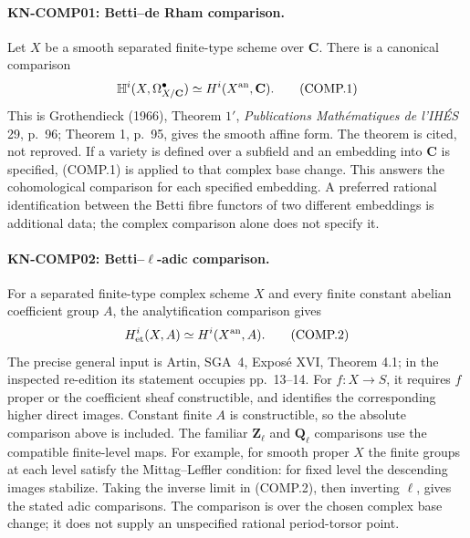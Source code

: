 \documentclass[11pt,a4paper]{article}
\theoremstyle{definition}\newtheorem{definition}[theorem]{Definition}
\theoremstyle{remark}\newtheorem{remark}[theorem]{Remark}
\begin{document}
\paragraph{KN-COMP01: Betti--de Rham comparison.}
Let $X$ be a smooth separated finite-type scheme over $\mathbf C$.
There is a canonical comparison
\[
 \mathbb H^i(X,\Omega^\bullet_{X/\mathbf C})
       \simeq H^i(X^{\rm an},\mathbf C).
 \tag{COMP.1}
\]
This is Grothendieck (1966), Theorem $1'$,
\emph{Publications Math\'ematiques de l'IH\'ES} 29, p.~96;
Theorem 1, p.~95, gives the smooth affine form.  The theorem is
cited, not reproved.  If a variety is defined over a subfield and
an embedding into $\mathbf C$ is specified, (COMP.1) is applied to
that complex base change.  This answers the cohomological comparison
for each specified embedding.  A preferred rational identification
between the Betti fibre functors of two different embeddings is
additional data; the complex comparison alone does not specify it.

\paragraph{KN-COMP02: Betti--\texorpdfstring{$\ell$}{ell}-adic comparison.}
For a separated finite-type complex scheme $X$ and every finite
constant abelian coefficient group $A$, the analytification comparison gives
\[
 H^i_{\rm et}(X,A)\simeq H^i(X^{\rm an},A).
 \tag{COMP.2}
\]
The precise general input is Artin, SGA~4, Expos\'e XVI,
Theorem 4.1; in the inspected re-edition its statement occupies
pp.~13--14.  For $f:X\to S$, it requires $f$ proper or the
coefficient sheaf constructible, and identifies the corresponding
higher direct images.  Constant finite $A$ is constructible, so the
absolute comparison above is included.  The familiar $\mathbf Z_\ell$
and $\mathbf Q_\ell$ comparisons use the compatible finite-level maps.
For example, for smooth proper $X$ the finite groups at each level
satisfy the Mittag--Leffler condition: for fixed level the descending
images stabilize.  Taking the inverse limit in (COMP.2), then
inverting $\ell$, gives the stated adic comparisons.  The comparison
is over the chosen complex base change; it does not supply an
unspecified rational period-torsor point.
\end{document}
